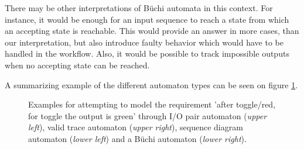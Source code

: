 There may be other interpretations of Büchi automata in this context. For instance, it would be enough for an input sequence to reach a state from which an accepting state is reachable. This would provide an answer in more cases, than our interpretation, but also introduce faulty behavior which would have to be handled in the workflow. Also, it would be possible to track impossible outputs when no accepting state can be reached.

A summarizing example of the different automaton types can be seen on figure \ref{fig_architecture_buchiexample}.

\begin{figure}[!ht] 
	\centering
	\caption{Examples for attempting to model the requirement 'after toggle/red, for toggle the output is green' through I/O pair automaton (\textit{upper left}), valid trace automaton (\textit{upper right}), sequence diagram automaton (\textit{lower left}) and a Büchi automaton (\textit{lower right}).} 
	\label{fig_architecture_buchiexample}
\end{figure}

